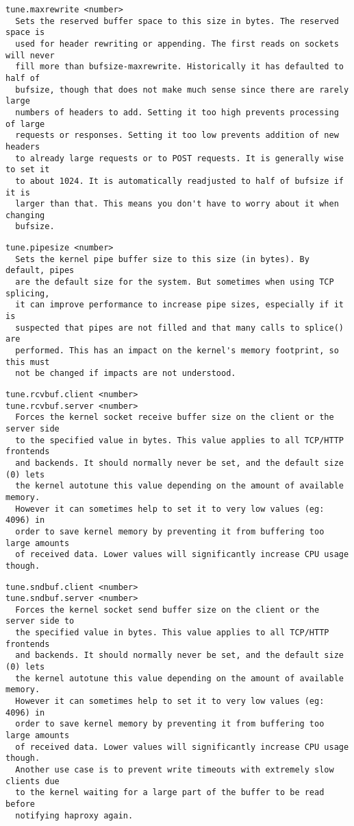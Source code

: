 \begin{verbatim}
tune.maxrewrite <number>
  Sets the reserved buffer space to this size in bytes. The reserved space is
  used for header rewriting or appending. The first reads on sockets will never
  fill more than bufsize-maxrewrite. Historically it has defaulted to half of
  bufsize, though that does not make much sense since there are rarely large
  numbers of headers to add. Setting it too high prevents processing of large
  requests or responses. Setting it too low prevents addition of new headers
  to already large requests or to POST requests. It is generally wise to set it
  to about 1024. It is automatically readjusted to half of bufsize if it is
  larger than that. This means you don't have to worry about it when changing
  bufsize.
\end{verbatim}

\begin{verbatim}
tune.pipesize <number>
  Sets the kernel pipe buffer size to this size (in bytes). By default, pipes
  are the default size for the system. But sometimes when using TCP splicing,
  it can improve performance to increase pipe sizes, especially if it is
  suspected that pipes are not filled and that many calls to splice() are
  performed. This has an impact on the kernel's memory footprint, so this must
  not be changed if impacts are not understood.
\end{verbatim}

\begin{verbatim}
tune.rcvbuf.client <number>
tune.rcvbuf.server <number>
  Forces the kernel socket receive buffer size on the client or the server side
  to the specified value in bytes. This value applies to all TCP/HTTP frontends
  and backends. It should normally never be set, and the default size (0) lets
  the kernel autotune this value depending on the amount of available memory.
  However it can sometimes help to set it to very low values (eg: 4096) in
  order to save kernel memory by preventing it from buffering too large amounts
  of received data. Lower values will significantly increase CPU usage though.
\end{verbatim}

\begin{verbatim}
tune.sndbuf.client <number>
tune.sndbuf.server <number>
  Forces the kernel socket send buffer size on the client or the server side to
  the specified value in bytes. This value applies to all TCP/HTTP frontends
  and backends. It should normally never be set, and the default size (0) lets
  the kernel autotune this value depending on the amount of available memory.
  However it can sometimes help to set it to very low values (eg: 4096) in
  order to save kernel memory by preventing it from buffering too large amounts
  of received data. Lower values will significantly increase CPU usage though.
  Another use case is to prevent write timeouts with extremely slow clients due
  to the kernel waiting for a large part of the buffer to be read before
  notifying haproxy again.
\end{verbatim}

